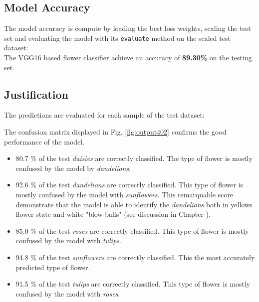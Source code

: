\subsection{Model Accuracy}

The model accuracy is compute by loading the best loss weights, scaling the test set and evaluating the model with its \texttt{evaluate} method on the scaled test dataset:
\\
The VGG16 based flower classifier achieve an accuracy of \textbf{89.30\%} on the testing set.

%
%
%
%

\subsection{Justification}

The predictions are evaluated for each sample of the test dataset:

%

The confusion matrix displayed in Fig. \ref{fig:output402} confirms the good performance of the model.

\begin{itemize}
	\item 80.7 \% of the test \textit{daisies} are correctly classified. The type of flower is mostly confused by the model by \textit{dandelions}.
	\item 92.6 \% of the test \textit{dandelions} are correctly classified. This type of flower is mostly confused by the model with \textit{sunflowers}. This remarquable score demonstrate that the model is able to identify the \textit{dandelions} both in yellows flower state and white "blow-balls" (see discussion in Chapter  ). 
	\item 85.0 \% of the test \textit{roses} are correctly classified. This type of flower is mostly confused by the model with \textit{tulips}.
	\item 94.8 \% of the test \textit{sunflowers} are correctly classified. This the most accurately predicted type of flower. 
	\item 91.5 \% of the test \textit{tulips} are correctly classified. This type of flower is mostly confused by the model with \textit{roses}.
\end{itemize}

